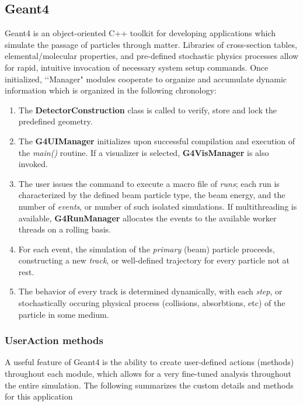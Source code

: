\documentclass{mc2015}
\begin{document}
\subsection{Geant4}

Geant4 is an object-oriented C++ toolkit for developing applications which simulate the passage of particles through matter. Libraries of cross-section tables, elemental/molecular properties, and pre-defined stochastic physics processes allow for rapid, intuitive invocation of necessary system setup commands. Once initialized, \lq\lq Manager" modules cooperate to organize and accumulate dynamic information which is organized in the following chronology:

\begin{enumerate}
\item The \textbf{DetectorConstruction} class is called to verify, store and lock the predefined geometry.
\item The \textbf{G4UIManager} initializes upon successful compilation and execution of the \emph{main()} routine.  If a visualizer is selected, \textbf{G4VisManager} is also invoked.
\item The user issues the command to execute a macro file of \emph{runs}; each run is characterized by the defined beam particle type, the beam energy, and the number of \emph{events}, or number of such isolated simulations.  If multithreading is available, \textbf{G4RunManager} allocates the events to the available worker threads on a rolling basis.
\item For each event, the simulation of the \emph{primary} (beam) particle proceeds, constructing a new \emph{track}, or well-defined trajectory for every particle not at rest.
\item The behavior of every track is determined dynamically, with each \emph{step}, or stochastically occuring physical process (collisions, absorbtions, etc) of the particle in some medium.
\end{enumerate}

\subsubsection{UserAction methods}

A useful feature of Geant4 is the ability to create user-defined actions (methods) throughout each module, which allows for a very fine-tuned analysis throughout the entire simulation.  The following summarizes the custom details and methods for this application
\end{document}
